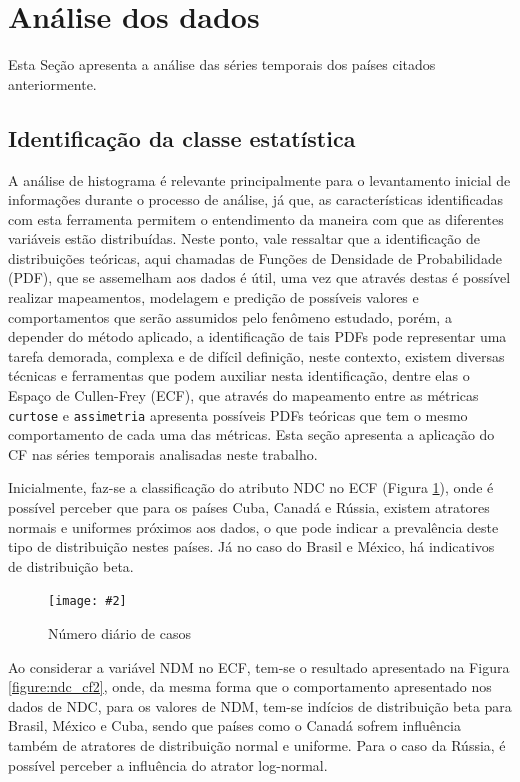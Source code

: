\documentclass[a4paper,12pt]{article}
\newcommand{\image}[4]{
    \begin{figure}[H]%
        \begin{center}
        \caption{#3}
        \texttt{[image: \#2]}
        \label{#4}
        \end{center}
    \end{figure}
}
\begin{document}
\section{Análise dos dados}

\par Esta Seção apresenta a análise das séries temporais dos países citados anteriormente. 

\subsection{Identificação da classe estatística}

\par A análise de histograma é relevante principalmente para o levantamento inicial de informações durante o processo de análise, já que, as características identificadas com esta ferramenta permitem o entendimento da maneira com que as diferentes variáveis estão distribuídas. Neste ponto, vale ressaltar que a identificação de distribuições teóricas, aqui chamadas de Funções de Densidade de Probabilidade (PDF), que se assemelham aos dados é útil, uma vez que através destas é possível realizar mapeamentos, modelagem e predição de possíveis valores e comportamentos que serão assumidos pelo fenômeno estudado, porém, a depender do método aplicado, a identificação de tais PDFs pode representar uma tarefa demorada, complexa e de difícil definição, neste contexto, existem diversas técnicas e ferramentas que podem auxiliar nesta identificação, dentre elas o Espaço de Cullen-Frey (ECF), que através do mapeamento entre as métricas \texttt{curtose} e \texttt{assimetria} apresenta possíveis PDFs teóricas que tem o mesmo comportamento de cada uma das métricas. Esta seção apresenta a aplicação do CF nas séries temporais analisadas neste trabalho.

\par Inicialmente, faz-se a classificação do atributo NDC no ECF (Figura \ref{figure:ndc_cf1}), onde é possível perceber que para os países Cuba, Canadá e Rússia, existem atratores normais e uniformes próximos aos dados, o que pode indicar a prevalência deste tipo de distribuição nestes países. Já no caso do Brasil e México, há indicativos de distribuição beta.

\image{0.5}{images/cullen_frey/1_histograma_casosdiarios}{Número diário de casos}{figure:ndc_cf1}

\par Ao considerar a variável NDM no ECF, tem-se o resultado apresentado na Figura \ref{figure:ndc_cf2}, onde, da mesma forma  que o comportamento apresentado nos dados de NDC, para os valores de NDM, tem-se indícios de distribuição beta para Brasil, México e Cuba, sendo que países como o Canadá sofrem influência também de atratores de distribuição normal e uniforme. Para o caso da Rússia, é possível perceber a influência do atrator log-normal.
\end{document}
